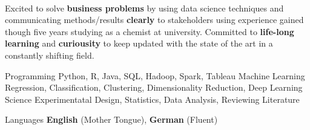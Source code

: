 

\\
  \begin{cvparagraph}
Excited to solve \textbf{business problems} by using data science techniques and communicating
methods/results \textbf{clearly} to stakeholders using experience gained though five
years studying as a chemist at university. Committed to \textbf{life-long learning}
and \textbf{curiousity} to keep updated with the state of the art in a constantly shifting 
field.
  \end{cvparagraph}

  \begin{cvskills}
    \cvskill
      {Programming} %
      {Python, R, Java, SQL, Hadoop, Spark, Tableau} %
    \cvskill
      {Machine Learning} %
      {Regression, Classification, Clustering, Dimensionality Reduction, Deep Learning} %
    \cvskill
      {Science} %
      {Experimentatal Design, Statistics, Data Analysis, Reviewing Literature} %


    \cvskill
      {Languages} %
      {\textbf{English} (Mother Tongue), \textbf{German} (Fluent)} %

  \end{cvskills}
